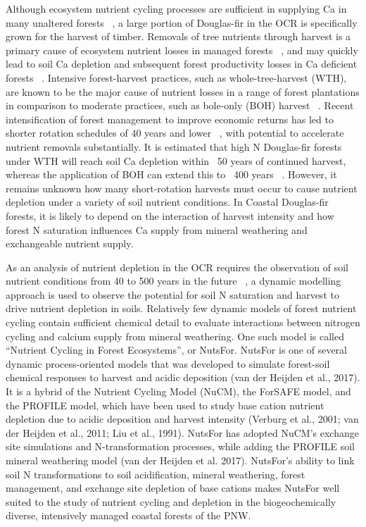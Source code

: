 Although ecosystem nutrient cycling processes are sufficient in supplying Ca in many unaltered forests ~\citep{vitousekLitterfallNutrientCycling1984, hiltonNutrientCyclingTropical1987}, a large portion of Douglas-fir in the OCR is specifically grown for the harvest of timber. Removals of tree nutrients through harvest is a primary cause of ecosystem nutrient losses in managed forests ~\citep{johnsonSymposiumForestSite1986}, and may quickly lead to soil Ca depletion and subsequent forest productivity losses in Ca deficient forests ~\citep{federerLongtermDepletionCalcium1989, nykvistTropicalForestsCan2000}. Intensive forest-harvest practices, such as whole-tree-harvest (WTH), are known to be the major cause of nutrient losses in a range of forest plantations in comparison to moderate practices, such as bole-only (BOH) harvest  ~\citep{achatQuantifyingConsequencesRemoving2015}. Recent intensification of forest management to improve economic returns has led to shorter rotation schedules of 40 years and lower ~\citep{diazTradeoffsTimberCarbon2018}, with potential to accelerate nutrient removals substantially. It is estimated that high N Douglas-fir forests under WTH will reach soil Ca depletion within ~50 years of continued harvest, whereas the application of BOH can extend this to ~400 years ~\citep{perakisCoupledNitrogenCalcium2006}. However, it remains unknown how many short-rotation harvests must occur to cause nutrient depletion under a variety of soil nutrient conditions.  In Coastal Douglas-fir forests, it is likely to depend on the interaction of harvest intensity and how forest N saturation influences Ca supply from mineral weathering and exchangeable nutrient supply. 

As an analysis of nutrient depletion in the OCR requires the observation of soil nutrient conditions from 40 to 500 years in the future ~\citep{perakisCoupledNitrogenCalcium2006}, a dynamic modelling approach is used to  observe the potential for soil N saturation and harvest to drive nutrient depletion in soils. Relatively few dynamic models of forest nutrient cycling contain sufficient chemical detail to evaluate interactions between nitrogen cycling and calcium supply from mineral weathering. One such model is called “Nutrient Cycling in Forest Ecosystems”, or NutsFor. NutsFor is one of several dynamic process-oriented models that was developed to simulate forest-soil chemical responses to harvest and acidic deposition (van der Heijden et al., 2017). It is a hybrid of the Nutrient Cycling Model (NuCM), the ForSAFE model, and the PROFILE model, which have been used to study base cation nutrient depletion due to acidic deposition and harvest intensity (Verburg et al., 2001; van der Heijden et al., 2011; Liu et al., 1991). NutsFor has adopted NuCM’s exchange site simulations and N-transformation processes, while adding the PROFILE soil mineral weathering model (van der Heijden et al. 2017). NutsFor’s ability to link soil N transformations to soil acidification, mineral weathering, forest management, and exchange site depletion of base cations makes NutsFor well suited to the study of nutrient cycling and depletion in the biogeochemically diverse, intensively managed coastal forests of the PNW. 

